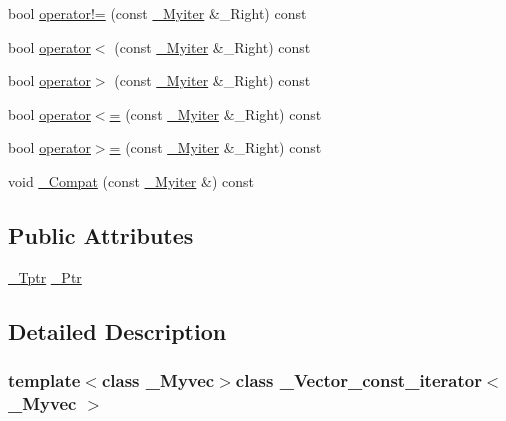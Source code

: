 \begin{DoxyCompactItemize}
bool \hyperlink{class___vector__const__iterator_ad39d47fe82c1c1dd61f3b507acedc13e}{operator!=} (const \hyperlink{class___vector__const__iterator_ac41cce1a95dfa665c2d7237fd94d776b}{\+\_\+\+Myiter} \&\+\_\+\+Right) const 
\item 
bool \hyperlink{class___vector__const__iterator_a9828845596ea577cd18ac917d4bf6ada}{operator$<$} (const \hyperlink{class___vector__const__iterator_ac41cce1a95dfa665c2d7237fd94d776b}{\+\_\+\+Myiter} \&\+\_\+\+Right) const 
\item 
bool \hyperlink{class___vector__const__iterator_a41bf77cee70e02ea7043aeafc5f52feb}{operator$>$} (const \hyperlink{class___vector__const__iterator_ac41cce1a95dfa665c2d7237fd94d776b}{\+\_\+\+Myiter} \&\+\_\+\+Right) const 
\item 
bool \hyperlink{class___vector__const__iterator_af6d151eed7372fb887708802fc016083}{operator$<$=} (const \hyperlink{class___vector__const__iterator_ac41cce1a95dfa665c2d7237fd94d776b}{\+\_\+\+Myiter} \&\+\_\+\+Right) const 
\item 
bool \hyperlink{class___vector__const__iterator_aa5eabf17e130fe96933e2035f8eac7bd}{operator$>$=} (const \hyperlink{class___vector__const__iterator_ac41cce1a95dfa665c2d7237fd94d776b}{\+\_\+\+Myiter} \&\+\_\+\+Right) const 
\item 
void \hyperlink{class___vector__const__iterator_afd73ab744b74a3fe26c9857a287f038e}{\+\_\+\+Compat} (const \hyperlink{class___vector__const__iterator_ac41cce1a95dfa665c2d7237fd94d776b}{\+\_\+\+Myiter} \&) const 
\end{DoxyCompactItemize}
\subsection*{Public Attributes}
\begin{DoxyCompactItemize}
\item 
\hyperlink{class___vector__const__iterator_a9b6960b4fe0656e2e83c54e6c7757a15}{\+\_\+\+Tptr} \hyperlink{class___vector__const__iterator_a4671fc4a9c2824046f5a827afb87b721}{\+\_\+\+Ptr}
\end{DoxyCompactItemize}


\subsection{Detailed Description}
\subsubsection*{template$<$class \+\_\+\+Myvec$>$class \+\_\+\+Vector\+\_\+const\+\_\+iterator$<$ \+\_\+\+Myvec $>$}



